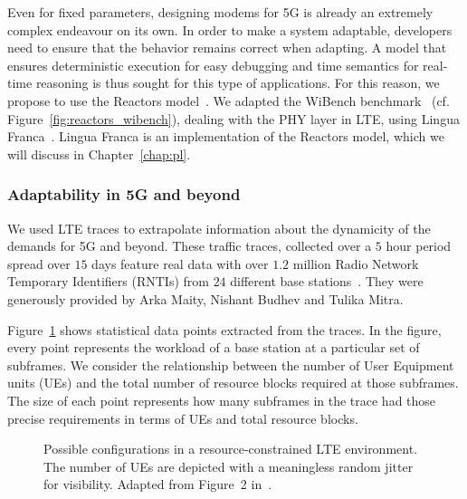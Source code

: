 Even for fixed parameters, designing modems for 5G is already an extremely complex endeavour on its own. 
In order to make a system adaptable, developers need to ensure that the behavior remains correct when adapting.
A model that ensures deterministic execution for easy debugging and time semantics for real-time reasoning is thus sought for this type of applications. 
For this reason, we propose to use the Reactors model~\cite{wittig_ict20}.
We adapted the WiBench benchmark~\cite{wibench} (cf. Figure~\ref{fig:reactors_wibench}), dealing with the PHY layer in LTE, using Lingua Franca~\cite{lingua_franca}.
Lingua Franca is an implementation of the Reactors model, which we will discuss in Chapter~\ref{chap:pl}.

\subsubsection{Adaptability in 5G and beyond}

We used LTE traces to extrapolate information about the dynamicity of the demands for 5G and beyond.
These traffic traces, collected over a $5$ hour period spread over $15$ days feature real data with over $1.2$ million Radio Network Temporary Identifiers (RNTIs) from $24$ different base stations~\cite{budhdev2020isoran}.
They were generously provided by Arka Maity, Nishant Budhev and Tulika Mitra.

Figure~\ref{fig:statistics} shows statistical data points extracted from the traces.
In the figure, every point represents the workload of a base station at a particular set of subframes.
We consider the relationship between the number of User Equipment units (UEs) and the total number of resource blocks required at those subframes.
The size of each point represents how many subframes in the trace had those precise requirements in terms of UEs and total resource blocks.

\begin{figure}[t]
	\centering
	\caption{Possible configurations in a resource-constrained LTE environment. The number of UEs are depicted with a meaningless random jitter for visibility. Adapted from Figure~2 in~\cite{wittig_ict20}.}
	\label{fig:statistics}
\end{figure}

